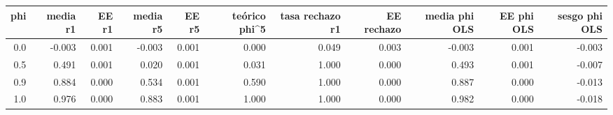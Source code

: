 \begin{tabular}{rrrrrrrrrrr}
\toprule
phi & media r1 & EE r1 & media r5 & EE r5 & teórico phi\textasciicircum{}5 & tasa rechazo r1 & EE rechazo & media phi OLS & EE phi OLS & sesgo phi OLS \\
\midrule
0.0 & -0.003 & 0.001 & -0.003 & 0.001 & 0.000 & 0.049 & 0.003 & -0.003 & 0.001 & -0.003 \\
0.5 & 0.491 & 0.001 & 0.020 & 0.001 & 0.031 & 1.000 & 0.000 & 0.493 & 0.001 & -0.007 \\
0.9 & 0.884 & 0.000 & 0.534 & 0.001 & 0.590 & 1.000 & 0.000 & 0.887 & 0.000 & -0.013 \\
1.0 & 0.976 & 0.000 & 0.883 & 0.001 & 1.000 & 1.000 & 0.000 & 0.982 & 0.000 & -0.018 \\
\bottomrule
\end{tabular}